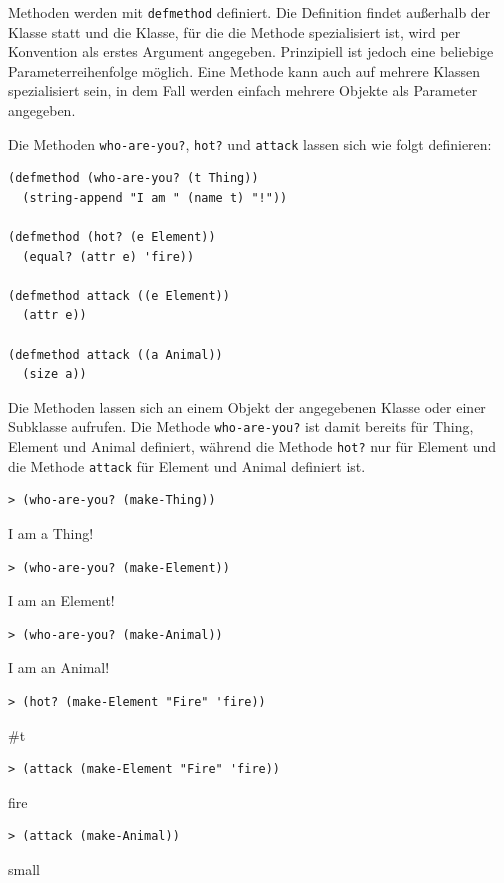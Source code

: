Methoden werden mit \texttt{defmethod} definiert. Die Definition findet außerhalb der Klasse statt und die Klasse, für die die Methode spezialisiert ist, wird per Konvention als erstes Argument angegeben. Prinzipiell ist jedoch eine beliebige Parameterreihenfolge möglich. Eine Methode kann auch auf mehrere Klassen spezialisiert sein, in dem Fall werden einfach mehrere Objekte als Parameter angegeben.

Die Methoden \texttt{who-are-you?}, \texttt{hot?} und \texttt{attack} lassen sich wie folgt definieren:

\begin{lstlisting}
(defmethod (who-are-you? (t Thing))
  (string-append "I am " (name t) "!"))

(defmethod (hot? (e Element))
  (equal? (attr e) 'fire))
  
(defmethod attack ((e Element))
  (attr e))
  
(defmethod attack ((a Animal))
  (size a))
\end{lstlisting}

Die Methoden lassen sich an einem Objekt der angegebenen Klasse oder einer Subklasse aufrufen. Die Methode \texttt{who-are-you?} ist damit bereits für Thing, Element und Animal definiert, während die Methode \texttt{hot?} nur für Element und die Methode \texttt{attack} für Element und Animal definiert ist.

\begin{lstlisting}
> (who-are-you? (make-Thing))
\end{lstlisting}
{\routput {\qq}I am a Thing!\qq}

\begin{lstlisting}
> (who-are-you? (make-Element))
\end{lstlisting}
{\routput {\qq}I am an Element!\qq}

\begin{lstlisting}
> (who-are-you? (make-Animal))
\end{lstlisting}
{\routput {\qq}I am an Animal!\qq}

\begin{lstlisting}
> (hot? (make-Element "Fire" 'fire))
\end{lstlisting}
{\routput \#t}

\begin{lstlisting}
> (attack (make-Element "Fire" 'fire))
\end{lstlisting}
{\rsymbol fire}

\begin{lstlisting}
> (attack (make-Animal))
\end{lstlisting}
{\rsymbol small}

